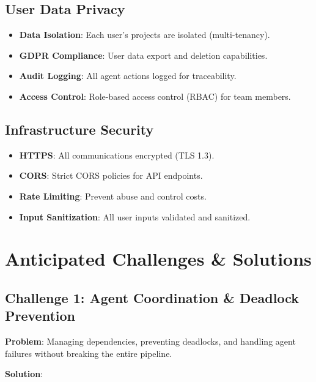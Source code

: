 \documentclass[11pt,a4paper]{article}
\begin{document}
\subsection{User Data Privacy}

\begin{itemize}
  \item \textbf{Data Isolation}: Each user's projects are isolated (multi-tenancy).
  \item \textbf{GDPR Compliance}: User data export and deletion capabilities.
  \item \textbf{Audit Logging}: All agent actions logged for traceability.
  \item \textbf{Access Control}: Role-based access control (RBAC) for team members.
\end{itemize}

\subsection{Infrastructure Security}

\begin{itemize}
  \item \textbf{HTTPS}: All communications encrypted (TLS 1.3).
  \item \textbf{CORS}: Strict CORS policies for API endpoints.
  \item \textbf{Rate Limiting}: Prevent abuse and control costs.
  \item \textbf{Input Sanitization}: All user inputs validated and sanitized.
\end{itemize}

\section{Anticipated Challenges \& Solutions}

\subsection{Challenge 1: Agent Coordination \& Deadlock Prevention}

\textbf{Problem}: Managing dependencies, preventing deadlocks, and handling agent failures without breaking the entire pipeline.

\textbf{Solution}:
\end{document}

